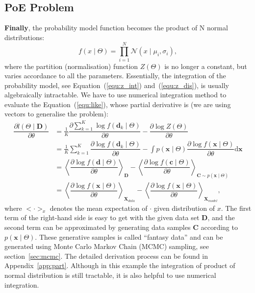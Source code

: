 \documentclass[11pt,twoside,a4paper]{article}
\def\D{\mathrm{d}}
\begin{document}
\subsection{PoE Problem}
	\textbf{Finally}, the probability model function becomes the product of N normal distributions: 
	\begin{equation}
	f(x \mid \Theta ) = \prod_{i=1}^N\mathcal{N}(x \mid \mu_i, \sigma_i ),
	\end{equation}
	where the partition (normalisation) function $Z( \Theta)$ is no longer a constant, but varies accordance to all the parameters.
	Essentially, the integration of the probability model, see Equation~(\ref{equ:z_int}) and~(\ref{equ:z_dis}), is usually algebraically intractable.
	We have to use numerical integration method to evaluate the Equation~(\ref{equ:like}), whose partial derivative is (we are using vectors to generalise the problem):
	\begin{equation}
	\label{equ:part}
	\begin{aligned}
	\dfrac{\partial \hat{l} (\Theta \mid \mathbf{D})}{\partial \theta} 
	& = \frac{1}{K} \dfrac{\partial \sum_{k=1}^K\log f(\mathbf{d}_k \mid \Theta )}{\partial \theta} - \dfrac{\partial \log Z( \Theta)}{\partial \theta}\\
	& =  \frac{1}{K}\sum_{k=1}^K \dfrac{\partial \log f(\mathbf{d}_k \mid \Theta)}{\partial \theta} - \int p(\mathbf{x} \mid \Theta) \dfrac{\partial \log f(\mathbf{x} \mid \Theta)}{\partial \theta} \D \mathbf{x}\\
	& = \left \langle \dfrac{\partial \log f(\mathbf{d} \mid \Theta)}{\partial \theta}\right \rangle_{\mathbf{D}} -\left \langle \dfrac{\partial \log f(\mathbf{c} \mid \Theta)}{\partial \theta}\right \rangle_{\mathbf{C} \sim p(\mathbf{x} \mid \Theta)}  \\
	&=\left \langle \dfrac{\partial \log f(\mathbf{x} \mid \Theta)}{\partial \theta}\right \rangle_{\mathbf{X}_{data}} - \left \langle \dfrac{\partial \log f(\mathbf{x} \mid \Theta)}{\partial \theta}\right \rangle_{\mathbf{X}_{model}},
	\end{aligned}
	\end{equation}
	where  $ <\cdot>_x $ denotes the mean expectation of $ \cdot $ given distribution of $x$.
	The first term of the right-hand side is easy to get with the given data set $ \mathbf{D} $, and the second term can be approximated by generating data samples $ \mathbf{C} $ according to $ p(\mathbf{x} \mid \Theta) $.
	These generative samples is called ``fantasy data'' and can be generated using Monte Carlo Markov Chain (MCMC) sampling, see section~\ref{sec:mcmc}.
	The detailed derivation process can be found in Appendix~\ref{app:part}.
	Although in this example the integration of product of normal distribution is still tractable, it is also helpful to use numerical integration.
\end{document}
